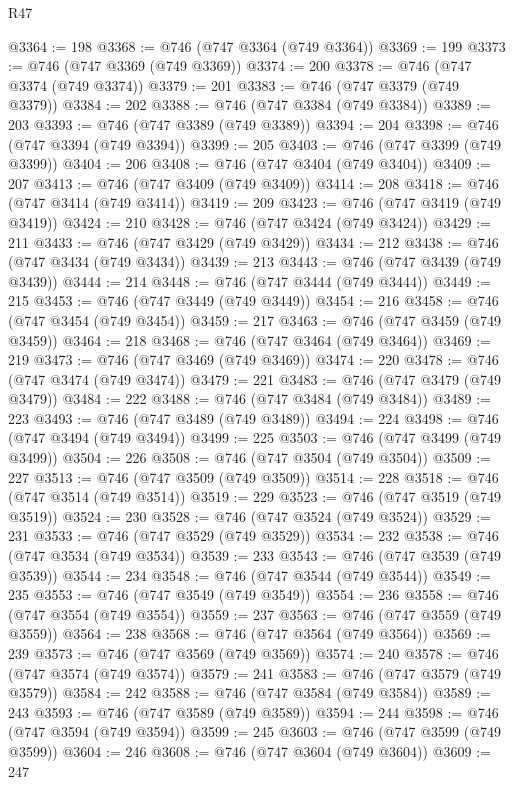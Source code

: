 \begin{lexlean}{R47}
\begin{coremodule}
@3364 := 198
@3368 := @746 (@747 @3364 (@749 @3364))
@3369 := 199
@3373 := @746 (@747 @3369 (@749 @3369))
@3374 := 200
@3378 := @746 (@747 @3374 (@749 @3374))
@3379 := 201
@3383 := @746 (@747 @3379 (@749 @3379))
@3384 := 202
@3388 := @746 (@747 @3384 (@749 @3384))
@3389 := 203
@3393 := @746 (@747 @3389 (@749 @3389))
@3394 := 204
@3398 := @746 (@747 @3394 (@749 @3394))
@3399 := 205
@3403 := @746 (@747 @3399 (@749 @3399))
@3404 := 206
@3408 := @746 (@747 @3404 (@749 @3404))
@3409 := 207
@3413 := @746 (@747 @3409 (@749 @3409))
@3414 := 208
@3418 := @746 (@747 @3414 (@749 @3414))
@3419 := 209
@3423 := @746 (@747 @3419 (@749 @3419))
@3424 := 210
@3428 := @746 (@747 @3424 (@749 @3424))
@3429 := 211
@3433 := @746 (@747 @3429 (@749 @3429))
@3434 := 212
@3438 := @746 (@747 @3434 (@749 @3434))
@3439 := 213
@3443 := @746 (@747 @3439 (@749 @3439))
@3444 := 214
@3448 := @746 (@747 @3444 (@749 @3444))
@3449 := 215
@3453 := @746 (@747 @3449 (@749 @3449))
@3454 := 216
@3458 := @746 (@747 @3454 (@749 @3454))
@3459 := 217
@3463 := @746 (@747 @3459 (@749 @3459))
@3464 := 218
@3468 := @746 (@747 @3464 (@749 @3464))
@3469 := 219
@3473 := @746 (@747 @3469 (@749 @3469))
@3474 := 220
@3478 := @746 (@747 @3474 (@749 @3474))
@3479 := 221
@3483 := @746 (@747 @3479 (@749 @3479))
@3484 := 222
@3488 := @746 (@747 @3484 (@749 @3484))
@3489 := 223
@3493 := @746 (@747 @3489 (@749 @3489))
@3494 := 224
@3498 := @746 (@747 @3494 (@749 @3494))
@3499 := 225
@3503 := @746 (@747 @3499 (@749 @3499))
@3504 := 226
@3508 := @746 (@747 @3504 (@749 @3504))
@3509 := 227
@3513 := @746 (@747 @3509 (@749 @3509))
@3514 := 228
@3518 := @746 (@747 @3514 (@749 @3514))
@3519 := 229
@3523 := @746 (@747 @3519 (@749 @3519))
@3524 := 230
@3528 := @746 (@747 @3524 (@749 @3524))
@3529 := 231
@3533 := @746 (@747 @3529 (@749 @3529))
@3534 := 232
@3538 := @746 (@747 @3534 (@749 @3534))
@3539 := 233
@3543 := @746 (@747 @3539 (@749 @3539))
@3544 := 234
@3548 := @746 (@747 @3544 (@749 @3544))
@3549 := 235
@3553 := @746 (@747 @3549 (@749 @3549))
@3554 := 236
@3558 := @746 (@747 @3554 (@749 @3554))
@3559 := 237
@3563 := @746 (@747 @3559 (@749 @3559))
@3564 := 238
@3568 := @746 (@747 @3564 (@749 @3564))
@3569 := 239
@3573 := @746 (@747 @3569 (@749 @3569))
@3574 := 240
@3578 := @746 (@747 @3574 (@749 @3574))
@3579 := 241
@3583 := @746 (@747 @3579 (@749 @3579))
@3584 := 242
@3588 := @746 (@747 @3584 (@749 @3584))
@3589 := 243
@3593 := @746 (@747 @3589 (@749 @3589))
@3594 := 244
@3598 := @746 (@747 @3594 (@749 @3594))
@3599 := 245
@3603 := @746 (@747 @3599 (@749 @3599))
@3604 := 246
@3608 := @746 (@747 @3604 (@749 @3604))
@3609 := 247

\end{coremodule}
\end{lexlean}
